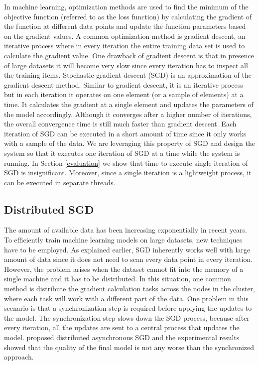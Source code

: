 \documentclass{sig-alternate-05-2015}
\begin{document}
In machine learning, optimization methods are used to find the minimum of the objective function (referred to as the loss function) by calculating the gradient of the function at different data points and update the function parameters based on the gradient values.
A common optimization method is gradient descent, an iterative process where in every iteration the entire training data set is used to calculate the gradient value.
One drawback of gradient descent is that in presence of large datasets it will become very slow since every iteration has to inspect all the training items.
Stochastic gradient descent (SGD) is an approximation of the gradient descent method. 
Similar to gradient descent, it is an iterative process but in each iteration it operates on one element (or a sample of elements) at a time. 
It calculates the gradient at a single element and updates the parameters of the model accordingly. 
Although it converges after a higher number of iterations, the overall convergence time is still much faster than gradient descent. 
Each iteration of SGD can be executed in a short amount of time since it only works with a sample of the data.
We are leveraging this property of SGD and design the system so that it executes one iteration of SGD at a time while the system is running.
In Section \ref{evaluation} we show that time to execute single iteration of SGD is insignificant.
Moreover, since a single iteration is a lightweight process, it can be executed in separate threads.

\subsection{Distributed SGD}
The amount of available data has been increasing exponentially in recent years.
To efficiently train machine learning models on large datasets, new techniques have to be employed.
As explained earlier, SGD inherently works well with large amount of data since it does not need to scan every data point in every iteration.
However, the problem arises when the dataset cannot fit into the memory of a single machine and it has to be distributed.
In this situation, one common method is distribute the gradient calculation tasks across the nodes in the cluster, where each task will work with a different part of the data.
One problem in this scenario is that a synchronization step is required before applying the updates to the model. 
The synchronization step slows down the SGD process, because after every iteration, all the updates are sent to a central process that updates the model.
\cite{recht2011hogwild, dean2012large} proposed distributed asynchronous SGD and the experimental results showed that the quality of the final model is not any worse than the synchronized approach. 
\end{document}
